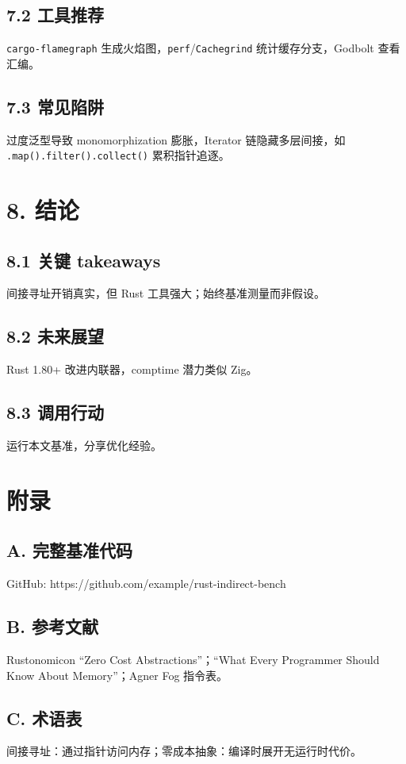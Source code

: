 \section{7.2 工具推荐}
\texttt{cargo-flamegraph} 生成火焰图，\texttt{perf}/\texttt{Cachegrind} 统计缓存分支，Godbolt 查看汇编。\par
\section{7.3 常见陷阱}
过度泛型导致 monomorphization 膨胀，Iterator 链隐藏多层间接，如 \texttt{.map().filter().collect()} 累积指针追逐。\par
\chapter{8. 结论}
\section{8.1 关键 takeaways}
间接寻址开销真实，但 Rust 工具强大；始终基准测量而非假设。\par
\section{8.2 未来展望}
Rust 1.80+ 改进内联器，comptime 潜力类似 Zig。\par
\section{8.3 调用行动}
运行本文基准，分享优化经验。\par
\chapter{附录}
\section{A. 完整基准代码}
GitHub: https://github.com/example/rust-indirect-bench\par
\section{B. 参考文献}
Rustonomicon “Zero Cost Abstractions”；“What Every Programmer Should Know About Memory”；Agner Fog 指令表。\par
\section{C. 术语表}
间接寻址：通过指针访问内存；零成本抽象：编译时展开无运行时代价。\par
